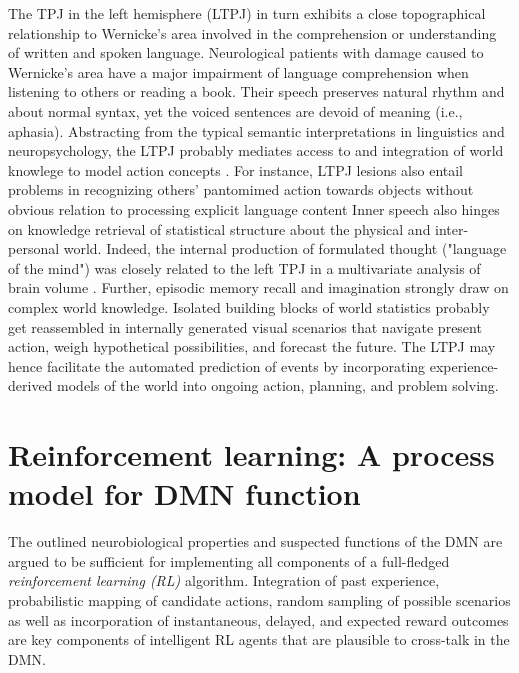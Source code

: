 \documentclass[10pt,letterpaper]{article}
\begin{document}
The TPJ in the left hemisphere (LTPJ) in turn exhibits a close topographical relationship to Wernicke's area
involved in the comprehension or understanding of written and spoken language.
Neurological patients with damage caused to Wernicke's area
have a major impairment of language comprehension
when listening to others or reading a book.
Their speech
preserves natural rhythm and about normal syntax, yet the
voiced sentences are devoid of meaning (i.e., aphasia).
Abstracting from the typical semantic interpretations in linguistics
and neuropsychology,
the LTPJ probably mediates access to and integration of world knowlege
to model action concepts
\citep{binder2011neurobiology, seghier2013angular}.
For instance, LTPJ lesions also entail problems in recognizing
others' pantomimed action towards objects
without obvious relation to processing explicit language content
\citep{varney1987locus}
%
Inner speech also hinges on knowledge retrieval of statistical structure
about the physical and inter-personal world.
Indeed,
the internal production of
formulated thought ("language of the mind") was closely related to the left TPJ
in a multivariate analysis of brain volume
\citep{geva2011neural}.
Further,
episodic memory recall and imagination strongly draw on
complex world knowledge.
Isolated building blocks of world statistics probably get reassembled
in internally generated visual scenarios that
navigate present action, weigh hypothetical possibilities, and forecast the future.
%
The LTPJ may hence facilitate the automated prediction of events
by incorporating experience-derived models of the world
into ongoing action, planning, and problem solving.



\section{Reinforcement learning: A process model for DMN function}
The outlined neurobiological properties and suspected functions of the DMN
are argued to be sufficient
for implementing all components
of a full-fledged \textit{reinforcement learning (RL)} algorithm.
Integration of past experience, probabilistic mapping of candidate actions,
random sampling of possible scenarios as well as
incorporation of instantaneous, delayed, and expected reward outcomes
are key components of intelligent RL agents
that are plausible to cross-talk in the DMN.
\end{document}
